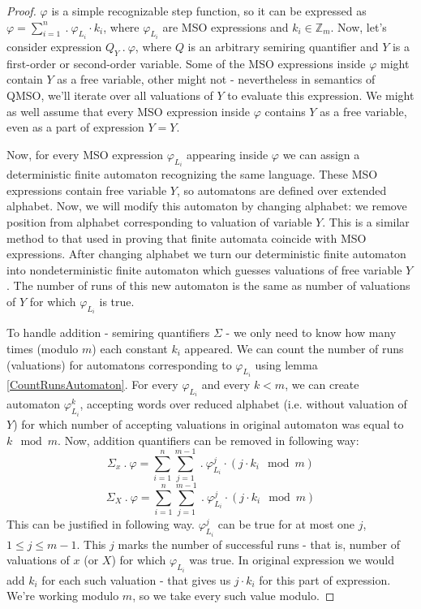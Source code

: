 \documentclass[12pt]{article}
\theoremstyle{definition}
\begin{document}
\begin{proof}
    $\varphi$ is a simple recognizable step function, so it can be expressed as $\varphi = \sum_{i = 1}^{n} \ . \ \varphi_{L_i} \cdot k_i$, where $\varphi_{L_i}$ are MSO expressions and $k_i \in \mathbb{Z}_m$. Now, let's consider expression $Q_{Y} \ . \ \varphi$, where $Q$ is an arbitrary semiring quantifier and $Y$ is a first-order or second-order variable. Some of the MSO expressions inside $\varphi$ might contain $Y$ as a free variable, other might not - nevertheless in semantics of QMSO, we'll iterate over all valuations of $Y$ to evaluate this expression. We might as well assume that every MSO expression inside $\varphi$ contains $Y$ as a free variable, even as a part of expression $Y = Y$.

    Now, for every MSO expression $\varphi_{L_i}$ appearing inside $\varphi$ we can assign a deterministic finite automaton recognizing the same language. These MSO expressions contain free variable $Y$, so automatons are defined over extended alphabet. Now, we will modify this automaton by changing alphabet: we remove position from alphabet corresponding to valuation of variable $Y$. This is a similar method to that used in proving that finite automata coincide with MSO expressions. After changing alphabet we turn our deterministic finite automaton into nondeterministic finite automaton which guesses valuations of free variable $Y$. The number of runs of this new automaton is the same as number of valuations of $Y$ for which $\varphi_{L_i}$ is true.

    To handle addition  - semiring quantifiers $\Sigma$ - we only need to know how many times (modulo $m$) each constant $k_i$ appeared. We can count the number of runs (valuations) for automatons corresponding to $\varphi_{L_i}$ using lemma \ref{CountRunsAutomaton}. For every $\varphi_{L_i}$ and every $k < m$, we can create automaton $\varphi_{L_i}^k$, accepting words over reduced alphabet (i.e. without valuation of $Y$) for which number of accepting valuations in original automaton was equal to $k \mod m$. Now, addition quantifiers can be removed in following way:
    $$\Sigma_x \ . \ \varphi = \sum_{i = 1}^n \sum_{j = 1}^{m-1} \ . \ \varphi_{L_i}^j \cdot (j \cdot k_i \mod m)$$
    $$\Sigma_X \ . \ \varphi = \sum_{i = 1}^n \sum_{j = 1}^{m-1} \ . \ \varphi_{L_i}^j \cdot (j \cdot k_i \mod m)$$
    This can be justified in following way. $\varphi_{L_i}^j$ can be true for at most one $j$, $1 \leq j \leq m-1$. This $j$ marks the number of successful runs - that is, number of valuations of $x$ (or $X$) for which $\varphi_{L_i}$ was true. In original expression we would add $k_i$ for each such valuation - that gives us $j \cdot k_i$ for this part of expression. We're working modulo $m$, so we take every such value modulo.
    

\end{proof}
\end{document}
